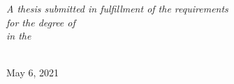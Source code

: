 \documentclass[
12pt, %
english, %
nohyperref, %
headsepline, %
]{MastersDoctoralThesis} %
\theoremstyle{remark}
\begin{document}
\begin{titlepage}
\begin{center}
\vfill

\large \textit{A thesis submitted in fulfillment of the requirements\\ for the degree of \degreename}\\[0.3cm] %
\textit{in the}\\[0.4cm]
\deptname\\[1cm] %
 
\vfill

{\large May 6, 2021}\\[2cm] %
 
\vfill
\end{center}
\end{titlepage}


%
% 
% 
\end{document}
